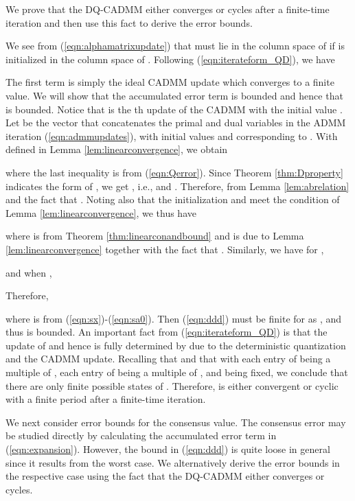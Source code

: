\documentclass[journal]{IEEEtran}
\begin{document}
\begin{IEEEproof} We prove that the DQ-CADMM either converges or cycles after a finite-time iteration and then use this fact to derive the error bounds.

We see from (\ref{eqn:alphamatrixupdate}) that  must lie in the column space of  if  is initialized in the column space of . Following (\ref{eqn:iterateform_QD}), we have 

The first term is simply the ideal CADMM update which converges to a finite value. We will show that the accumulated error term  is bounded and hence that  is bounded. Notice that  is the th update of the CADMM with the initial value . Let  be the vector that concatenates the primal and dual variables in the ADMM iteration (\ref{eqn:admmupdates}), with initial values  and  corresponding to . With  defined in Lemma \ref{lem:linearconvergence}, we obtain

where the last inequality is from (\ref{eqn:Qerror}).
Since Theorem \ref{thm:Dproperty} indicates the form of , we get , i.e.,  and . Therefore,  from Lemma \ref{lem:abrelation} and the fact that . Noting also that the initialization  and  meet the condition of Lemma \ref{lem:linearconvergence}, we thus have 

where  is from Theorem \ref{thm:linearconandbound} and  is due to Lemma \ref{lem:linearconvergence} together with the fact that . Similarly, we have for ,

and when , 
 
Therefore, 

where  is from (\ref{eqn:sx})-(\ref{eqn:sa0}). Then (\ref{eqn:ddd}) must be finite for  as , and thus  is bounded. An important fact from (\ref{eqn:iterateform_QD}) is that the update of  and hence  is fully determined by  due to the deterministic quantization and the CADMM update. Recalling that  and that  with each entry of  being a multiple of , each entry of  being a multiple of , and  being fixed, we conclude that there are only finite possible states of . Therefore,  is either convergent or cyclic with a finite period  after a finite-time iteration. 

We next consider error bounds for the consensus value. The consensus error may be studied directly by calculating the accumulated error term in (\ref{eqn:expansion}). However, the bound in (\ref{eqn:ddd}) is quite loose in general since it results from the worst case. We alternatively derive the error bounds in the respective case using the fact that the DQ-CADMM either converges or cycles.


\end{IEEEproof}
\end{document}
